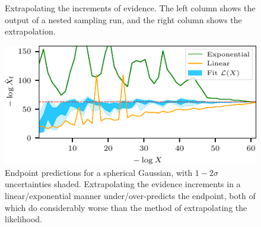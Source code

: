 \documentclass[usenatbib]{mnras}
\begin{document}
\begin{figure}
\begin{adjustbox}{valign=t, scale=0.72}
\end{adjustbox}
\quad
\begin{adjustbox}{valign=t}
\end{adjustbox}
\caption{Extrapolating the increments of evidence. The left column shows the output of a nested sampling run, and the right column shows the extrapolation.}
\label{fig:inc_extrapolate}
\end{figure}
\begin{figure}
\includegraphics{figures/inc_predictions.pdf}
\caption{Endpoint predictions for a spherical Gaussian, with $1-2\sigma$ uncertainties shaded. Extrapolating the evidence increments in a linear/exponential manner under/over-predicts the endpoint, both of which do considerably worse than the method of extrapolating the likelihood.}
\label{fig:inc_predictions}
\end{figure}
\end{document}

